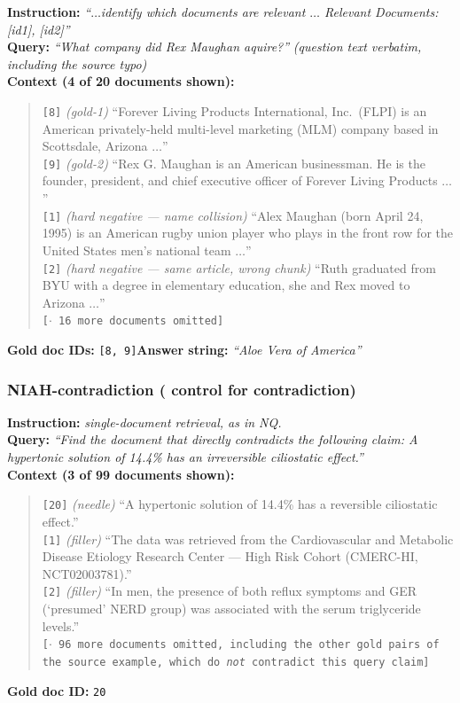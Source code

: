 \textbf{Instruction:} \emph{``$\dots$identify which documents are relevant $\dots$ Relevant
Documents: [id1], [id2]''}\\
\textbf{Query:} \emph{``What company did Rex Maughan aquire?''} \emph{(question text verbatim,
including the source typo)}\\
\textbf{Context (4 of 20 documents shown):}
\begin{quote}\small
\texttt{[8]} \emph{(gold-1)} ``Forever Living Products International, Inc.\ (FLPI) is an American
privately-held multi-level marketing (MLM) company based in Scottsdale, Arizona $\dots$''\\
\texttt{[9]} \emph{(gold-2)} ``Rex G. Maughan is an American businessman. He is the founder,
president, and chief executive officer of Forever Living Products $\dots$''\\
\texttt{[1]} \emph{(hard negative --- name collision)} ``Alex Maughan (born April 24, 1995) is an
American rugby union player who plays in the front row for the United States men's national team
$\dots$''\\
\texttt{[2]} \emph{(hard negative --- same article, wrong chunk)} ``Ruth graduated from BYU with a
degree in elementary education, she and Rex moved to Arizona $\dots$''\\
\texttt{[$\cdot$ 16 more documents omitted]}
\end{quote}
\textbf{Gold doc IDs:} \texttt{[8, 9]}\quad\textbf{Answer string:} \emph{``Aloe Vera of America''}

\subsubsection{NIAH-contradiction ( control for contradiction)}

\textbf{Instruction:} \emph{single-document retrieval, as in NQ.}\\
\textbf{Query:} \emph{``Find the document that directly contradicts the following claim: A hypertonic
solution of 14.4\% has an irreversible ciliostatic effect.''}\\
\textbf{Context (3 of 99 documents shown):}
\begin{quote}\small
\texttt{[20]} \emph{(needle)} ``A hypertonic solution of 14.4\% has a reversible ciliostatic
effect.''\\
\texttt{[1]} \emph{(filler)} ``The data was retrieved from the Cardiovascular and Metabolic Disease
Etiology Research Center --- High Risk Cohort (CMERC-HI, NCT02003781).''\\
\texttt{[2]} \emph{(filler)} ``In men, the presence of both reflux symptoms and GER (`presumed' NERD
group) was associated with the serum triglyceride levels.''\\
\texttt{[$\cdot$ 96 more documents omitted, including the other gold pairs of the source example,
which do \emph{not} contradict this query claim]}
\end{quote}
\textbf{Gold doc ID:} \texttt{20}

